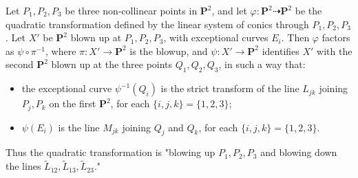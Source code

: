 Let $P_1, P_2, P_3$ be three non-collinear points in $\mathbf{P}^2$, and let $\varphi: \mathbf{P}^2 \dashrightarrow \mathbf{P}^2$ be the quadratic transformation defined by the linear system of conics through $P_1, P_2, P_3$. Let $X'$ be $\mathbf{P}^2$ blown up at $P_1, P_2, P_3$, with exceptional curves $E_i$. Then $\varphi$ factors as $\psi \circ \pi^{-1}$, where $\pi: X' \to \mathbf{P}^2$ is the blowup, and $\psi: X' \to \mathbf{P}^2$ identifies $X'$ with the second $\mathbf{P}^2$ blown up at the three points $Q_1, Q_2, Q_3$, in such a way that:
\begin{itemize}
\item the exceptional curve $\psi^{-1}(Q_i)$ is the strict transform of the line $L_{jk}$ joining $P_j, P_k$ on the first $\mathbf{P}^2$, for each $\{i,j,k\} = \{1,2,3\}$;
\item $\psi(E_i)$ is the line $M_{jk}$ joining $Q_j$ and $Q_k$, for each $\{i,j,k\} = \{1,2,3\}$.
\end{itemize}
Thus the quadratic transformation is "blowing up $P_1, P_2, P_3$ and blowing down the lines $\tilde{L}_{12}, \tilde{L}_{13}, \tilde{L}_{23}$."
